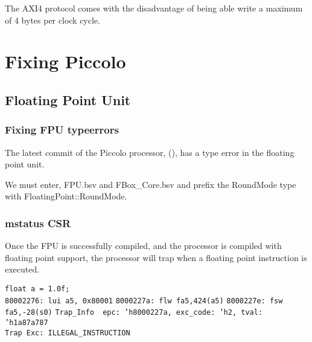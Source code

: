 \documentclass[a4paper,9pt]{report}
\begin{document}
The AXI4 protocol comes with the disadvantage of being able write a maximum of 4
bytes per clock cycle.

\section{Fixing Piccolo}
\subsection{Floating Point Unit}
\subsubsection{Fixing FPU typeerrors}
The latest commit of the Piccolo processor, (), has a type error in the floating
point unit. 

We must enter, FPU.bsv and FBox\_Core.bsv and prefix the RoundMode type with FloatingPoint::RoundMode.





\subsubsection{mstatus CSR}
Once the FPU is successfully compiled, and the processor is compiled with
floating point support, the processor will trap when a floating point
instruction is executed.

\texttt{float a = 1.0f;} \\
\texttt{80002276: lui a5, 0x80001}
\texttt{8000227a: flw fa5,424(a5)}
\texttt{8000227e: fsw fa5,-28(s0)}
\texttt{Trap\_Info { epc: 'h8000227a, exc\_code: 'h2, tval: 'h1a87a787 }} \\
\texttt{Trap Exc: ILLEGAL\_INSTRUCTION} \\
\end{document}
